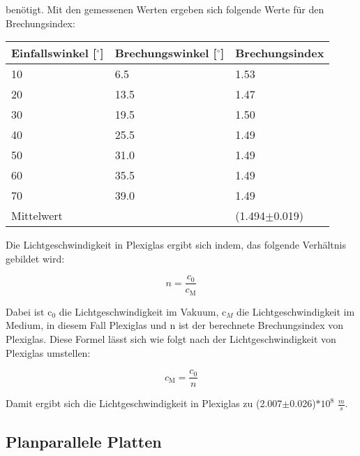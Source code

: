 \noindent benötigt. Mit den gemessenen Werten ergeben sich folgende Werte für den Brechungsindex:

\begin{minipage}{\linewidth}
    \begin{table}[H]
        \centering
    \begin{tabular}{lll}
        \toprule
        Einfallswinkel [$^\circ$] & Brechungswinkel [$^\circ$] & Brechungsindex \\
        \midrule
        10 &  6.5 & 1.53 \\
        20 & 13.5 & 1.47 \\
        30 & 19.5 & 1.50 \\
        40 & 25.5 & 1.49 \\ 
        50 & 31.0 & 1.49 \\
        60 & 35.5 & 1.49 \\
        70 & 39.0 & 1.49 \\
        \midrule
        Mittelwert & & (1.494$\pm$0.019)\\
        \bottomrule   
    \end{tabular}
    
    \label{tab:2}
\end{table}
\end{minipage}

\noindent Die Lichtgeschwindigkeit in Plexiglas ergibt sich indem, das folgende Verhältnis gebildet wird:

\begin{displaymath}
    n = \frac{c_0}{c_\text{M}}
\end{displaymath}

\noindent Dabei ist c$_0$ die Lichtgeschwindigkeit im Vakuum, c$_M$ die Lichtgeschwindigkeit im Medium, in diesem Fall Plexiglas und n ist der berechnete Brechungsindex von Plexiglas. Diese Formel lässt sich wie folgt nach der Lichtgeschwindigkeit von Plexiglas umstellen:

\begin{displaymath}
    c_\text{M} = \frac{c_0}{n} 
\end{displaymath}

\noindent Damit ergibt sich die Lichtgeschwindigkeit in Plexiglas zu (2.007$\pm$0.026)$*10^8$ $\frac{m}{s}$.

\subsection{Planparallele Platten}

